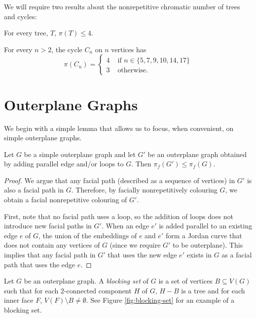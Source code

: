 \documentclass{patmorin}
\begin{document}
We will require two results about the nonrepetitive chromatic number of
trees and cycles:

\begin{thm}
  For every tree, $T$, $\pi(T) \leq 4$.
\end{thm}

\begin{thm}
  For every $n>2$, the cycle $C_n$ on $n$ vertices has
  \[
  \pi(C_n) = \begin{cases}
              4 & \text{ if } n \in \{5,7,9,10,14,17\} \\
              3 & \text{ otherwise. }
             \end{cases}
  \]
\end{thm}

\section{Outerplane Graphs}

We begin with a simple lemma that allows us to focus, when convenient,
on simple outerplane graphs.

\begin{lem}
  Let $G$ be a simple outerplane graph and let $G'$ be an outerplane graph obtained by adding parallel edge and/or loops to $G$.  Then $\pi_f(G')\le\pi_f(G)$.
\end{lem}

\begin{proof}
   We argue that any facial path (described as a sequence of vertices)
   in $G'$ is also a facial path in $G$.  Therefore, by facially
   nonrepetitively colouring $G$, we obtain a facial nonrepetitive
   colouring of $G'$.

   First, note that no facial path uses a loop, so the addition of
   loops does not introduce new facial paths in $G'$.  When an edge
   $e'$ is added parallel to an existing edge $e$ of $G$, the union
   of the embeddings of $e$ and $e'$ form a Jordan curve that does not
   contain any vertices of $G$ (since we require $G'$ to be outerplane).
   This implies that any facial path in $G'$ that uses the new edge $e'$
   exists in $G$ as a facial path that uses the edge $e$.
\end{proof}

Let $G$ be an outerplane graph. A \emph{blocking set} of $G$ is a set
of vertices $B \subseteq V(G)$ such that for each 2-connected component
$H$ of $G$, $H-B$ is a tree and for each inner face $F$,
$V(F) \setminus B \ne \emptyset$.  See Figure \ref{fig:blocking-set}
for an example of a blocking set.
\end{document}
